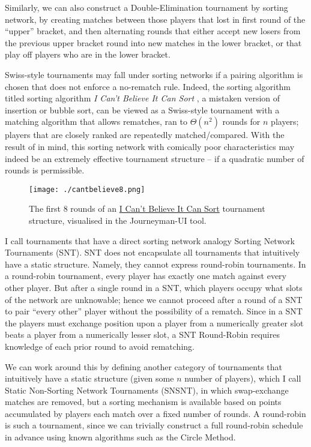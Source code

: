 \documentclass[a4,11pt,twoside,final,hidelinks]{article}
\begin{document}
Similarly, we can also construct a Double-Elimination tournament by sorting
network, by creating matches between those players that lost in first round of
the ``upper'' bracket, and then alternating rounds that either accept new losers
from the previous upper bracket round into new matches in the lower bracket, or
that play off players who are in the lower bracket.

Swiss-style tournaments may fall under sorting networks if a pairing algorithm
is chosen that does not enforce a no-rematch rule. Indeed, the sorting algorithm
titled sorting algorithm \emph{I Can't Believe It Can Sort}
\autocite{cant-believe-it-can-sort}, a mistaken version of insertion or bubble
sort, can be viewed as a Swiss-style tournament with a matching algorithm that
allows rematches, ran to \(\Theta(n^2)\) rounds for \(n\) players; players that are
closely ranked are repeatedly matched/compared. With the result of
\citeauthor*{tournament-efficacy} in mind, this sorting network with comically
poor characteristics may indeed be an extremely effective tournament structure
-- if a quadratic number of rounds is permissible.

\begin{figure}[htbp]
\centering
\texttt{[image: ./cantbelieve8.png]}
\caption{\label{fig:cantbelieve8}The first 8 rounds of an \uline{I Can't Believe It Can Sort} tournament structure, visualised in the Journeyman-UI tool.}
\end{figure}

I call tournaments that have a direct sorting network analogy Sorting Network
Tournaments (SNT). SNT does not encapsulate all tournaments that intuitively
have a static structure. Namely, they cannot express round-robin tournaments. In
a round-robin tournament, every player has exactly one match against every other
player. But after a single round in a SNT, which players occupy what slots of
the network are unknowable; hence we cannot proceed after a round of a SNT to
pair ``every other'' player without the possibility of a rematch. Since in a SNT
the players must exchange position upon a player from a numerically greater slot
beats a player from a numerically lesser slot, a SNT Round-Robin requires
knowledge of each prior round to avoid rematching.

We can work around this by defining another category of tournaments that
intuitively have a static structure (given some \(n\) number of players), which I
call Static Non-Sorting Network Tournaments (SNSNT), in which swap-exchange
matches are removed, but a sorting mechanism is available based on points
accumulated by players each match over a fixed number of rounds. A round-robin
is such a tournament, since we can trivially construct a full round-robin
schedule in advance using known algorithms such as the Circle Method.
\end{document}
